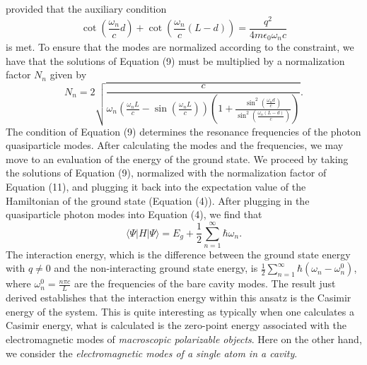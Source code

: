 \documentclass[aps,prb,twocolumn,
	groupedaddress,superscriptaddress,
	amsfonts,amssymb,amsmath,floatfix,
	citeautoscript]{revtex4-1}
\begin{document}
provided that the auxiliary condition
\begin{equation}
\cot\left(\frac{\omega_n}{c}d \right)+\cot\left(\frac{\omega_n}{c}(L-d) \right) = \frac{q^2}{4m\epsilon_0\omega_nc}
\end{equation}
is met. To ensure that the modes are normalized according to the constraint, we have that the solutions of Equation (9) must be multiplied by a normalization factor $N_n$ given by
\begin{equation}
N_n = 2\sqrt{\frac{c}{\omega_n\left(\frac{\omega_nL}{c}-\sin\left(\frac{\omega_nL}{c}\right) \right)\left(1+\frac{\sin^2\left(\frac{\omega_nd}{c}\right)}{\sin^2\left(\frac{\omega_n(L-d)}{c}\right)} \right)}}.
\end{equation}
The condition of Equation (9) determines the resonance frequencies of the photon quasiparticle modes. After calculating the modes and the frequencies, we may move to an evaluation of the energy of the ground state. We proceed by taking the solutions of Equation (9), normalized with the normalization factor of Equation (11), and plugging it back into the expectation value of the Hamiltonian of the ground state (Equation (4)). After plugging in the quasiparticle photon modes into Equation (4), we find that
\begin{equation}
\langle \Psi | H|\Psi\rangle = E_{g}+\frac{1}{2}\sum\limits_{n=1}^{\infty}\hbar\omega_n.
\end{equation}
The interaction energy, which is the difference between the ground state energy with $q\neq 0$ and the non-interacting ground state energy, is $\frac{1}{2}\sum\limits_{n=1}^{\infty}\hbar(\omega_n-\omega_n^0)$, where $\omega_n^0 = \frac{n\pi c}{L}$ are the frequencies of the bare cavity modes. The result just derived establishes that the interaction energy within this ansatz is the Casimir energy of the system. This is quite interesting as typically when one calculates a Casimir energy, what is calculated is the zero-point energy associated with the electromagnetic modes of \textit{macroscopic polarizable objects}. Here on the other hand, we consider the \textit{electromagnetic modes of a single atom in a cavity}.
\end{document}
